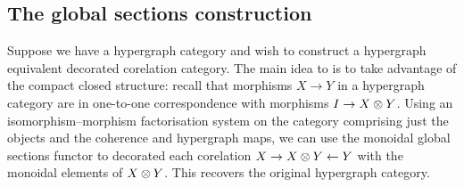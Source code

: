 \subsection{The global sections construction}
Suppose we have a hypergraph category and wish to construct a hypergraph
equivalent decorated corelation category. The main idea to is to take advantage
of the compact closed structure: recall that morphisms $X \to Y$ in a hypergraph
category are in one-to-one correspondence with morphisms $I \to X\otimes Y$. Using
an isomorphism--morphism factorisation system on the category comprising just
the objects and the coherence and hypergraph maps, we can use the monoidal
global sections functor to decorated each corelation $X \to X \otimes Y \leftarrow
Y$ with the monoidal elements of $X\otimes Y$. This recovers the original hypergraph
category.


